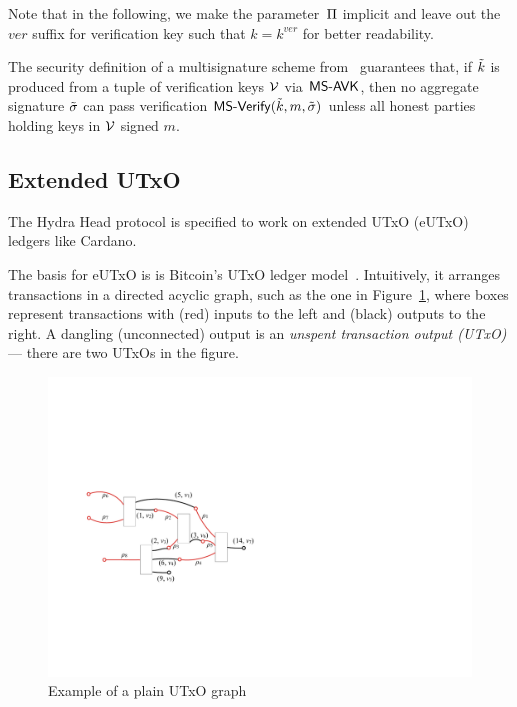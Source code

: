 Note that in the following, we make the parameter~$\Pi$ implicit and leave
out the $ver$ suffix for verification key such that $k = k^{ver}$ for better
readability.

The security definition of a multisignature scheme
from~\cite{itakura1983public,CCS:MicOhtRey01} guarantees that, if $\tilde{k}$ is
produced from a tuple of verification keys $\mathcal{V}$ via $\mathsf{MS\textsf{-}{}AVK}$,
then no aggregate signature $\tilde\sigma$ can pass verification
$\mathsf{MS\textsf{-}{}Verify}(\tilde{k},m,\tilde\sigma)$ unless all honest parties holding keys in
$\mathcal{V}$ signed $m$.

\subsection{Extended UTxO}
The Hydra Head protocol is specified to work on extended UTxO (eUTxO) ledgers
like Cardano.

The basis for eUTxO is is Bitcoin's UTxO ledger
model~\cite{formal-model-of-bitcoin-transactions,Zahnentferner18-UTxO}.
Intuitively, it arranges transactions in a directed acyclic graph, such as the
one in Figure~\ref{fig:utxo-graph}, where boxes represent transactions with
(red) inputs to the left and (black) outputs to the right. A dangling
(unconnected) output is an \emph{unspent transaction output (UTxO)} --- there
are two UTxOs in the figure.

\begin{figure}[h]
  \centering
 \includegraphics[width=\textwidth/2]{figures/utxo-graph.pdf}
 \caption{Example of a plain UTxO graph}
  \label{fig:utxo-graph}
\end{figure}

